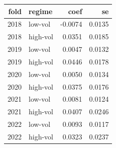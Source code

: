 \begin{tabular}{rlrr}
\toprule
fold & regime & coef & se \\
\midrule
2018 & low-vol & -0.0074 & 0.0135 \\
2018 & high-vol & 0.0351 & 0.0185 \\
2019 & low-vol & 0.0047 & 0.0132 \\
2019 & high-vol & 0.0446 & 0.0178 \\
2020 & low-vol & 0.0050 & 0.0134 \\
2020 & high-vol & 0.0375 & 0.0176 \\
2021 & low-vol & 0.0081 & 0.0124 \\
2021 & high-vol & 0.0407 & 0.0246 \\
2022 & low-vol & 0.0093 & 0.0117 \\
2022 & high-vol & 0.0323 & 0.0237 \\
\bottomrule
\end{tabular}
